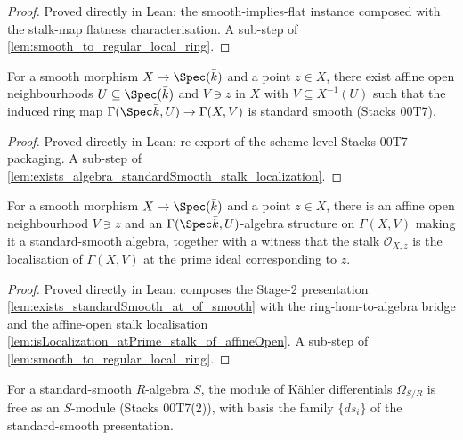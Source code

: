 \begin{proof}
  Proved directly in Lean: the smooth-implies-flat instance composed with the
  stalk-map flatness characterisation. A sub-step of
  \cref{lem:smooth_to_regular_local_ring}.
\end{proof}

\begin{lemma}
  \label{lem:exists_standardSmooth_at_of_smooth}
  For a smooth morphism \(X \to \Spec(\bar k)\) and a point \(z \in X\), there
  exist affine open neighbourhoods \(U \subseteq \Spec(\bar k)\) and \(V \ni z\)
  in \(X\) with \(V \subseteq X^{-1}(U)\) such that the induced ring map
  \(\Gamma(\Spec \bar k, U) \to \Gamma(X, V)\) is standard smooth (Stacks 00T7).
\end{lemma}

\begin{proof}
  Proved directly in Lean: re-export of the scheme-level Stacks 00T7 packaging.
  A sub-step of \cref{lem:exists_algebra_standardSmooth_stalk_localization}.
\end{proof}

\begin{lemma}
  \label{lem:exists_algebra_standardSmooth_stalk_localization}
  For a smooth morphism \(X \to \Spec(\bar k)\) and a point \(z \in X\), there is
  an affine open neighbourhood \(V \ni z\) and an \(\Gamma(\Spec \bar k, U)\)-algebra
  structure on \(\Gamma(X, V)\) making it a standard-smooth algebra, together with a
  witness that the stalk \(\mathcal O_{X, z}\) is the localisation of \(\Gamma(X, V)\)
  at the prime ideal corresponding to \(z\).
\end{lemma}

\begin{proof}
  Proved directly in Lean: composes the Stage-2 presentation
  \cref{lem:exists_standardSmooth_at_of_smooth} with the ring-hom-to-algebra bridge
  and the affine-open stalk localisation
  \cref{lem:isLocalization_atPrime_stalk_of_affineOpen}. A sub-step of
  \cref{lem:smooth_to_regular_local_ring}.
\end{proof}

\begin{lemma}
  \label{lem:module_free_kaehler_standardSmooth}
  For a standard-smooth \(R\)-algebra \(S\), the module of K\"ahler differentials
  \(\Omega_{S/R}\) is free as an \(S\)-module (Stacks 00T7(2)), with basis the family
  \(\{ds_i\}\) of the standard-smooth presentation.
\end{lemma}

